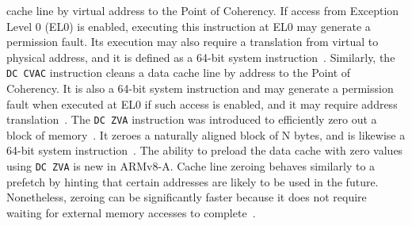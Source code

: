         cache line by virtual address to the Point of Coherency. If access from Exception Level 0 (EL0) is 
        enabled, executing this instruction at EL0 may generate a permission fault. Its execution may also 
        require a translation from virtual to physical address, and it is defined as a 64-bit system 
        instruction~\cite{docDCCIVAC, datasheetCortexASeries}. Similarly, the \texttt{DC CVAC} instruction cleans a data cache line by address to 
        the Point of Coherency. It is also a 64-bit system instruction and may generate a permission fault 
        when executed at EL0 if such access is enabled, and it may require address translation~\cite{docDCCVAC, datasheetCortexASeries}. 
        The \texttt{DC ZVA} instruction was introduced to efficiently zero out a block of memory~\cite{paperTriggeringRHHardwareFault}. 
        It zeroes a naturally aligned block of N bytes, and is 
        likewise a 64-bit system instruction~\cite{docDCZVA, datasheetCortexASeries}. The ability to preload the data cache with zero 
        values using \texttt{DC ZVA} is new in ARMv8-A. Cache line zeroing behaves similarly to a prefetch by hinting 
        that certain addresses are likely to be used in the future. Nonetheless, zeroing can be significantly 
        faster because it does not require waiting for external memory accesses to complete~\cite{paperTriggeringRHHardwareFault, paperRHonRi3B+}.
    
